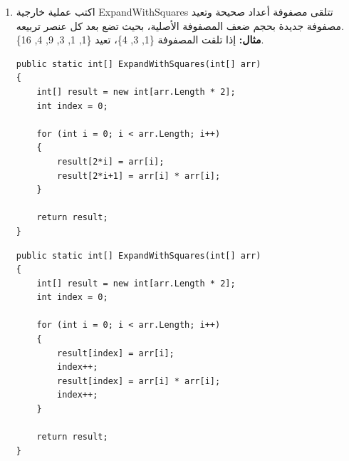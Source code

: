 \documentclass[14pt]{extarticle}
\begin{document}
\begin{enumerate}[itemsep=3em]
\begin{boxSolution}
\begin{english}
\begin{verbatim}
    int count = 0;
    for (int i = 0; i < arr.Length; i++)
    {
        if (arr[i] == maxVal)
            count++;
    }
    return count;
}
    \end{verbatim}
    \end{english}
    \end{boxSolution}
    \clearpage
    \fi

    \item
    اكتب عملية خارجية \textenglish{ExpandWithSquares} تتلقى مصفوفة أعداد صحيحة وتعيد مصفوفة جديدة بحجم ضعف المصفوفة الأصلية، بحيث تضع بعد كل عنصر تربيعه.\\
    \textbf{مثال:} إذا تلقت المصفوفة \textenglish{\{1, 3, 4\}}، تعيد \textenglish{\{1, 1, 3, 9, 4, 16\}}.
    \ifwithsols
    \begin{boxSolution}[1]
    \begin{english}
    \begin{verbatim}
public static int[] ExpandWithSquares(int[] arr)
{
    int[] result = new int[arr.Length * 2];
    int index = 0;

    for (int i = 0; i < arr.Length; i++)
    {
        result[2*i] = arr[i];
        result[2*i+1] = arr[i] * arr[i];
    }

    return result;
}
    \end{verbatim}
    \end{english}
    \end{boxSolution}
    \clearpage
    \begin{boxSolution}[2]
    \begin{english}
    \begin{verbatim}
public static int[] ExpandWithSquares(int[] arr)
{
    int[] result = new int[arr.Length * 2];
    int index = 0;

    for (int i = 0; i < arr.Length; i++)
    {
        result[index] = arr[i];
        index++;
        result[index] = arr[i] * arr[i];
        index++;
    }

    return result;
}
    \end{verbatim}
    \end{english}
    \end{boxSolution}
    \clearpage
    \fi


\end{enumerate}
\end{document}
